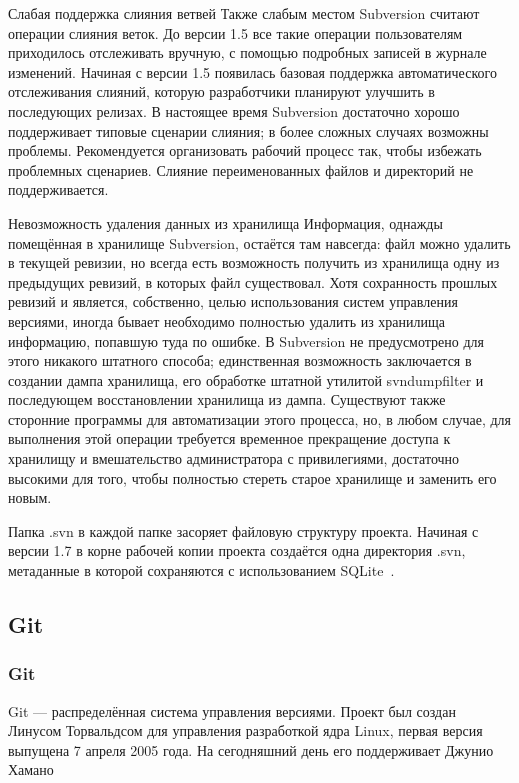 \documentclass{../industrial-development}
\begin{document}
Слабая поддержка слияния ветвей
Также слабым местом Subversion считают операции слияния веток. До версии 1.5 все такие операции пользователям приходилось отслеживать вручную, с помощью подробных записей в журнале изменений. Начиная с версии 1.5 появилась базовая поддержка автоматического отслеживания слияний, которую разработчики планируют улучшить в последующих релизах. В настоящее время Subversion достаточно хорошо поддерживает типовые сценарии слияния; в более сложных случаях возможны проблемы. Рекомендуется организовать рабочий процесс так, чтобы избежать проблемных сценариев. Слияние переименованных файлов и директорий не поддерживается.

Невозможность удаления данных из хранилища
Информация, однажды помещённая в хранилище Subversion, остаётся там навсегда: файл можно удалить в текущей ревизии, но всегда есть возможность получить из хранилища одну из предыдущих ревизий, в которых файл существовал. Хотя сохранность прошлых ревизий и является, собственно, целью использования систем управления версиями, иногда бывает необходимо полностью удалить из хранилища информацию, попавшую туда по ошибке. В Subversion не предусмотрено для этого никакого штатного способа; единственная возможность заключается в создании дампа хранилища, его обработке штатной утилитой svndumpfilter и последующем восстановлении хранилища из дампа. Существуют также сторонние программы для автоматизации этого процесса, но, в любом случае, для выполнения этой операции требуется временное прекращение доступа к хранилищу и вмешательство администратора с привилегиями, достаточно высокими для того, чтобы полностью стереть старое хранилище и заменить его новым.

Папка .svn в каждой папке
засоряет файловую структуру проекта. Начиная с версии 1.7 в корне рабочей копии проекта создаётся одна директория .svn, метаданные в которой сохраняются с использованием SQLite~\cite{SVNWikipedia}.

\subsection{Git}

\begin{frame} \frametitle{Git}
  \begin{block}{}
    \alert{Git} --- распределённая система управления версиями. Проект был создан Линусом Торвальдсом для управления разработкой ядра Linux, первая версия выпущена 7 апреля 2005 года. На сегодняшний день его поддерживает Джунио Хамано
  \end{block}
\end{frame}
\end{document}
